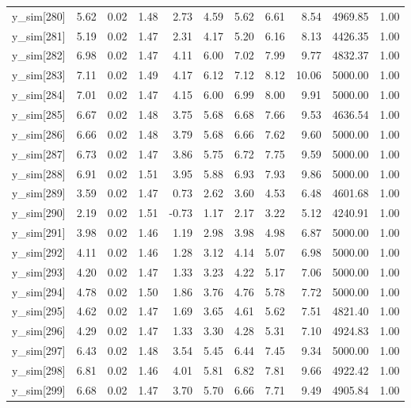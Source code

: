 \begin{table}[ht]
\begin{tabular}{rrrrrrrrrrr}
  y\_sim[280] & 5.62 & 0.02 & 1.48 & 2.73 & 4.59 & 5.62 & 6.61 & 8.54 & 4969.85 & 1.00 \\ 
  y\_sim[281] & 5.19 & 0.02 & 1.47 & 2.31 & 4.17 & 5.20 & 6.16 & 8.13 & 4426.35 & 1.00 \\ 
  y\_sim[282] & 6.98 & 0.02 & 1.47 & 4.11 & 6.00 & 7.02 & 7.99 & 9.77 & 4832.37 & 1.00 \\ 
  y\_sim[283] & 7.11 & 0.02 & 1.49 & 4.17 & 6.12 & 7.12 & 8.12 & 10.06 & 5000.00 & 1.00 \\ 
  y\_sim[284] & 7.01 & 0.02 & 1.47 & 4.15 & 6.00 & 6.99 & 8.00 & 9.91 & 5000.00 & 1.00 \\ 
  y\_sim[285] & 6.67 & 0.02 & 1.48 & 3.75 & 5.68 & 6.68 & 7.66 & 9.53 & 4636.54 & 1.00 \\ 
  y\_sim[286] & 6.66 & 0.02 & 1.48 & 3.79 & 5.68 & 6.66 & 7.62 & 9.60 & 5000.00 & 1.00 \\ 
  y\_sim[287] & 6.73 & 0.02 & 1.47 & 3.86 & 5.75 & 6.72 & 7.75 & 9.59 & 5000.00 & 1.00 \\ 
  y\_sim[288] & 6.91 & 0.02 & 1.51 & 3.95 & 5.88 & 6.93 & 7.93 & 9.86 & 5000.00 & 1.00 \\ 
  y\_sim[289] & 3.59 & 0.02 & 1.47 & 0.73 & 2.62 & 3.60 & 4.53 & 6.48 & 4601.68 & 1.00 \\ 
  y\_sim[290] & 2.19 & 0.02 & 1.51 & -0.73 & 1.17 & 2.17 & 3.22 & 5.12 & 4240.91 & 1.00 \\ 
  y\_sim[291] & 3.98 & 0.02 & 1.46 & 1.19 & 2.98 & 3.98 & 4.98 & 6.87 & 5000.00 & 1.00 \\ 
  y\_sim[292] & 4.11 & 0.02 & 1.46 & 1.28 & 3.12 & 4.14 & 5.07 & 6.98 & 5000.00 & 1.00 \\ 
  y\_sim[293] & 4.20 & 0.02 & 1.47 & 1.33 & 3.23 & 4.22 & 5.17 & 7.06 & 5000.00 & 1.00 \\ 
  y\_sim[294] & 4.78 & 0.02 & 1.50 & 1.86 & 3.76 & 4.76 & 5.78 & 7.72 & 5000.00 & 1.00 \\ 
  y\_sim[295] & 4.62 & 0.02 & 1.47 & 1.69 & 3.65 & 4.61 & 5.62 & 7.51 & 4821.40 & 1.00 \\ 
  y\_sim[296] & 4.29 & 0.02 & 1.47 & 1.33 & 3.30 & 4.28 & 5.31 & 7.10 & 4924.83 & 1.00 \\ 
  y\_sim[297] & 6.43 & 0.02 & 1.48 & 3.54 & 5.45 & 6.44 & 7.45 & 9.34 & 5000.00 & 1.00 \\ 
  y\_sim[298] & 6.81 & 0.02 & 1.46 & 4.01 & 5.81 & 6.82 & 7.81 & 9.66 & 4922.42 & 1.00 \\ 
  y\_sim[299] & 6.68 & 0.02 & 1.47 & 3.70 & 5.70 & 6.66 & 7.71 & 9.49 & 4905.84 & 1.00 \\ 

\end{tabular}
\end{table}
